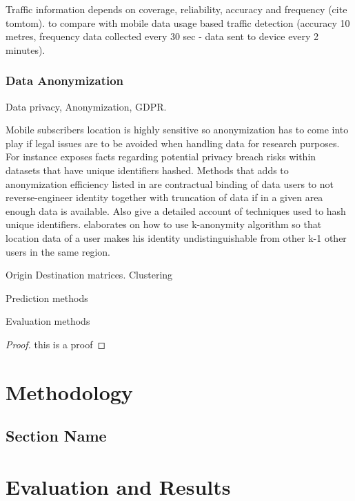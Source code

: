 \documentclass[12pt, a4paper]{report}
\theoremstyle{definition}
\theoremstyle{definition}%
\theoremstyle{definition}%
\theoremstyle{definition}%
\theoremstyle{definition}%
\theoremstyle{definition}%
\begin{document}
Traffic information depends on coverage, reliability, accuracy and frequency (cite tomtom).
to compare with mobile data usage based traffic detection (accuracy 10 metres, frequency data collected every 30 sec - data sent to device every 2 minutes). 

\subsection{Data Anonymization} \label{data_anonymization} 

Data privacy, Anonymization, GDPR.

Mobile subscribers location is highly sensitive so anonymization has to come into play if legal issues are to be avoided when handling data for research purposes. For instance \cite{Laurila2012} exposes facts regarding potential privacy breach risks within datasets that have unique identifiers hashed. Methods that adds to anonymization efficiency listed in \cite{Laurila2012} are contractual binding of data users to not reverse-engineer identity together with truncation of data if in a given area enough data is available. Also \cite{Laurila2012} give a detailed account of techniques used to hash unique identifiers.\cite{Shin} elaborates on how to use k-anonymity algorithm so that location data of a user makes his identity undistinguishable from other k-1 other users in the same region.




Origin Destination matrices.
Clustering



Prediction methods


Evaluation methods


\begin{proof}
this is a proof
\end{proof}

\chapter{Methodology}
\section{Section Name}

\chapter{Evaluation and Results}
\end{document}
